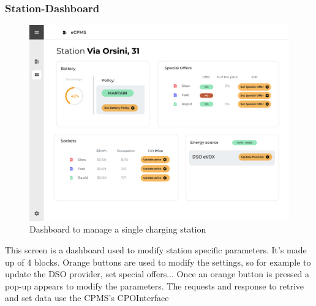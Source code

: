 \subsubsection{Station-Dashboard}
\begin{center}
    \begin{figure}[H]
        \includegraphics[width=\textwidth]{./img/design/web/station.png}
        \caption{Dashboard to manage a single charging station}
    \end{figure}
\end{center}
This screen is a dashboard used to modify station specific parameters. It's made up of 4 blocks. Orange buttons are used to modify the settings, so for example to update the DSO provider, set special offers... Once an orange button is pressed a pop-up appears to modify the parameters. The requests and response to retrive and set data use the CPMS's CPOInterface